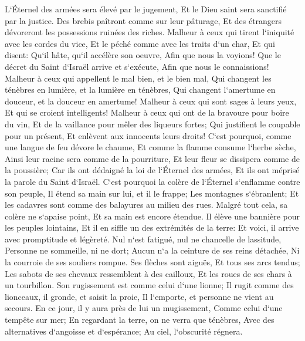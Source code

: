 \verse L`Éternel des armées sera élevé par le jugement, Et le Dieu saint sera sanctifié par la justice. 
\verse Des brebis paîtront comme sur leur pâturage, Et des étrangers dévoreront les possessions ruinées des riches. 
\verse Malheur à ceux qui tirent l`iniquité avec les cordes du vice, Et le péché comme avec les traits d`un char, 
\verse Et qui disent: Qu`il hâte, qu`il accélère son oeuvre, Afin que nous la voyions! Que le décret du Saint d`Israël arrive et s`exécute, Afin que nous le connaissions! 
\verse Malheur à ceux qui appellent le mal bien, et le bien mal, Qui changent les ténèbres en lumière, et la lumière en ténèbres, Qui changent l`amertume en douceur, et la douceur en amertume! 
\verse Malheur à ceux qui sont sages à leurs yeux, Et qui se croient intelligents! 
\verse Malheur à ceux qui ont de la bravoure pour boire du vin, Et de la vaillance pour mêler des liqueurs fortes; 
\verse Qui justifient le coupable pour un présent, Et enlèvent aux innocents leurs droits! 
\verse C`est pourquoi, comme une langue de feu dévore le chaume, Et comme la flamme consume l`herbe sèche, Ainsi leur racine sera comme de la pourriture, Et leur fleur se dissipera comme de la poussière; Car ils ont dédaigné la loi de l`Éternel des armées, Et ils ont méprisé la parole du Saint d`Israël. 
\verse C`est pourquoi la colère de l`Éternel s`enflamme contre son peuple, Il étend sa main sur lui, et il le frappe; Les montagnes s`ébranlent; Et les cadavres sont comme des balayures au milieu des rues. Malgré tout cela, sa colère ne s`apaise point, Et sa main est encore étendue. 
\verse Il élève une bannière pour les peuples lointains, Et il en siffle un des extrémités de la terre: Et voici, il arrive avec promptitude et légèreté. 
\verse Nul n`est fatigué, nul ne chancelle de lassitude, Personne ne sommeille, ni ne dort; Aucun n`a la ceinture de ses reins détachée, Ni la courroie de ses souliers rompue. 
\verse Ses flèches sont aiguës, Et tous ses arcs tendus; Les sabots de ses chevaux ressemblent à des cailloux, Et les roues de ses chars à un tourbillon. 
\verse Son rugissement est comme celui d`une lionne; Il rugit comme des lionceaux, il gronde, et saisit la proie, Il l`emporte, et personne ne vient au secours. 
\verse En ce jour, il y aura près de lui un mugissement, Comme celui d`une tempête sur mer; En regardant la terre, on ne verra que ténèbres, Avec des alternatives d`angoisse et d`espérance; Au ciel, l`obscurité régnera. 

